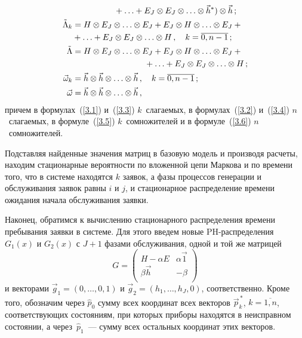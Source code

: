 \begin{multicols}{2}
\begin{align}
&\ \ \ \ \ \ \ \ \ \ \ \ \ \ \ {}+ \ldots + E_J \otimes E_J \otimes \ldots \otimes \vec h^* )
 \otimes \vec h\,; \label{3.2}  \\                               %
\tilde \Lambda_k & = H \otimes E_J \otimes \ldots \otimes E_J +
E_J \otimes H \otimes \ldots \otimes E_J +{}\notag\\
&{}+ \ldots + E_J \otimes E_J \otimes \ldots \otimes H\,,
\quad k=\overline{0,n-1}\,;  \label{3.3}          \\            %
\tilde \Lambda & = H \otimes E_J \otimes \ldots \otimes E_J +
E_J \otimes H \otimes \ldots \otimes E_J +{}\notag\\
&\ \ \ \ \ \ \ \ \ \ \ \ \ \ \ \ \ \ \ \ \ \ \ \ \ \ {}+ \ldots + E_J \otimes E_J \otimes \ldots
\otimes H\,; \label{3.4} \\                                   %
\vec \omega_k & = \vec h \otimes \vec h \otimes \ldots \otimes \vec h\,,
\quad k=\overline{0,n-1}\,; \label{3.5} \\                      %
\vec \omega & = \vec h \otimes \vec h \otimes \ldots
\otimes \vec h\,, \label{3.6}                               %
\end{align}
причем в формулах~(\ref{3.1}) и~(\ref{3.3}) $k$~слагаемых,
в формулах~(\ref{3.2}) и~(\ref{3.4}) $n$~слагаемых,
в формуле~(\ref{3.5}) $k$~сомножителей и в формуле~(\ref{3.6})
$n$~сомножителей.

Подставляя найденные значения матриц в базовую модель и
производя расчеты, находим стационарные вероятности по
вложенной цепи Маркова и по времени того, что в системе
находятся $k$ заявок, а фазы процессов генерации и
обслуживания заявок равны $i$ и $j$, и стационарное
распределение времени ожидания начала обслуживания заявки.

Наконец, обратимся к вычислению стационарного распределения
времени пребывания заявки в системе.
Для этого введем новые PH-рас\-пре\-де\-ле\-ния $G_1(x)$ и $G_2(x)$
с $J+1$ фазами обслуживания, одной и той же матрицей
$$
G=
\begin{pmatrix}
H-\alpha E       &  \alpha \vec1  \\
\beta \vec h     &  - \beta       \\
\end{pmatrix}
$$
и векторами $ \vec g_1 = (0,\ldots, 0,1)$ и
$ \vec g_2 = (h_1,\ldots, h_J,0)$, соответственно.
Кроме того, обозначим через $\hat p_0$ сумму всех координат
всех векторов $\vec p^{\,*}_{k}$, $k=\overline{1,n}$, соответствующих
состояниям, при которых приборы находятся в неисправном состоянии,
а через~$\hat p_1$~--- сумму всех остальных координат этих векторов.
{

}
\end{multicols}

